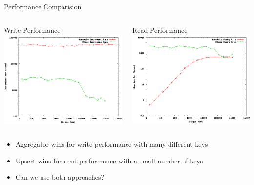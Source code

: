 \documentclass[t,landscape]{beamer}
\begin{document}
\begin{frame}{Performance Comparision}
\begin{columns}
\begin{center}
Write Performance
\includegraphics[width=\textwidth]{images/increment_comparison.png}
\end{center}
\begin{center}
Read Performance
\includegraphics[width=\textwidth]{images/increment_query_comparison.png}
\end{center}
\end{columns}
\small
\begin{itemize}
\item{Aggregator wins for write performance with many different keys}
\item{Upsert wins for read performance with a small number of keys}
\item{Can we use both approaches?}
\end{itemize}
\end{frame}
\end{document}
